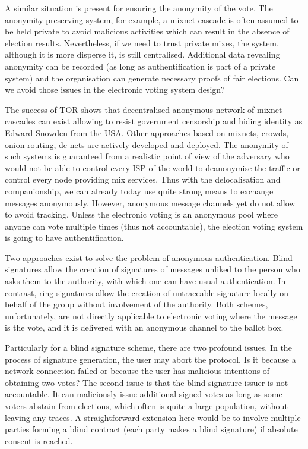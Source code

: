 \documentclass[12pt]{article}
\begin{document}
A similar situation is present for ensuring the anonymity of the vote. The anonymity preserving system, for example, a mixnet cascade is often assumed to be held private to avoid malicious activities which can result in the absence of election results. Nevertheless, if we need to trust private mixes, the system, although it is more disperse it, is still centralised. Additional data revealing anonymity can be recorded (as long as authentification is part of a private system) and the organisation can generate necessary proofs of fair elections. Can we avoid those issues in the electronic voting system design?

The success of TOR shows that decentralised anonymous network of mixnet cascades can exist allowing to resist government censorship and hiding identity as Edward Snowden from the USA. Other approaches based on mixnets, crowds, onion routing, dc nets are actively developed and deployed. The anonymity of such systems is guaranteed from a realistic point of view of the adversary who would not be able to control every ISP of the world to deanonymise the traffic or control every node providing mix services. Thus with the delocalisation and companionship, we can already today use quite strong means to exchange messages anonymously. However, anonymous message channels yet do not allow to avoid tracking. Unless the electronic voting is an anonymous pool where anyone can vote multiple times (thus not accountable), the election voting system is going to have authentification. 

Two approaches exist to solve the problem of anonymous authentication. Blind signatures allow the creation of signatures of messages unliked to the person who asks them to the authority, with which one can have usual authentication. In contrast, ring signatures allow the creation of untraceable signature locally on behalf of the group without involvement of the authority. Both schemes, unfortunately, are not directly applicable to electronic voting where the message is the vote, and it is delivered with an anonymous channel to the ballot box.

Particularly for a blind signature scheme, there are two profound issues. In the process of signature generation, the user may abort the protocol. Is it because a network connection failed or because the user has malicious intentions of obtaining two votes? The second issue is that the blind signature issuer is not accountable. It can maliciously issue additional signed votes as long as some voters abstain from elections, which often is quite a large population, without leaving any traces. A straightforward extension here would be to involve multiple parties forming a blind contract (each party makes a blind signature) if absolute consent is reached.
\end{document}
